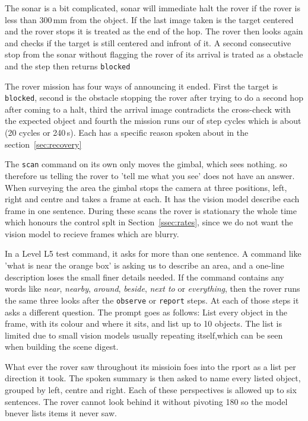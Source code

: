 The sonar is a bit complicated, sonar will immediate halt the rover if the rover is less than 300\,mm from the object. If the last image taken is the target centered and the rover stops
it is treated as the end of the hop. The rover then looks again and checks if the target is still centered and infront of it. A second consecutive stop from the sonar without 
flagging the rover of its arrival is trated as a obstacle and the step then returns \texttt{blocked}

The rover mission has four ways of announcing it ended. First the target is \texttt{blocked}, second is the obstacle stopping the rover after trying to do a second hop after coming to a halt, third
the arrival image contradicts the cross-check with the expected object and fourth the mission runs our of step cycles which is about (20 cycles or 240\,s). Each has a specific
reason spoken about in the section~\ref{sec:recovery}


\label{ssec:survey}

The \texttt{scan} command on its own only moves the gimbal, which sees nothing. so therefore us telling the rover to 'tell me what you see' does not have an answer. 
When surveying the area the gimbal stops the camera at three positions, left, right and centre and takes a frame at each. It has the vision model describe each frame 
in one sentence. During these scans the rover is stationary the whole time which honours the control splt in Section~\ref{ssec:rates}, since we do not want the vision
model to recieve frames which are blurry.

In a Level L5 test command, it asks for more than one sentence. A command like 'what is near the orange box' is asking us to describe an area, and a one-line description loses 
the small finer details needed. If the command contains any words like \emph{near}, \emph{nearby}, \emph{around},
\emph{beside}, \emph{next to} or \emph{everything}, then the rover runs the same three looks after the \texttt{observe} or \texttt{report} steps. At each of those steps
it asks a different question. The prompt goes as follows: List every object in the frame, with its colour and where it sits, and list up to 10 objects. The list is limited due to 
small vision models usually repeating itself,which can be seen when building the scene digest. 

What ever the rover saw throughout its missioin foes into the rport as a list per direction it took. The spoken summary
is then asked to name every listed object, grouped by left, centre and right. Each of these perspectives is allowed up to six sentences. The rover cannot look behind it
without pivoting 180\textdegree{} so the model bnever lists items it never saw.



